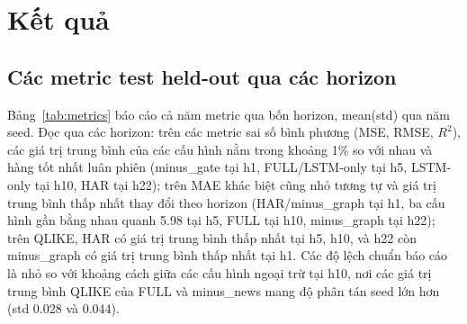\documentclass[runningheads]{llncs}
\begin{document}
\section{Kết quả}
\label{sec:results}

\subsection{Các metric test held-out qua các horizon}
\label{sec:metrics}
Bảng~\ref{tab:metrics} báo cáo cả năm metric qua bốn horizon, mean(std) qua năm seed. Đọc qua các
horizon: trên các metric sai số bình phương (MSE, RMSE, $R^2$), các giá trị trung bình của các cấu hình
nằm trong khoảng 1\% so với nhau và hàng tốt nhất luân phiên (minus\_gate tại h1, FULL/LSTM-only tại h5,
LSTM-only tại h10, HAR tại h22); trên MAE khác biệt cũng nhỏ tương tự và giá trị trung bình thấp nhất
thay đổi theo horizon (HAR/minus\_graph tại h1, ba cấu hình gần bằng nhau quanh 5.98 tại h5, FULL tại h10,
minus\_graph tại h22); trên QLIKE, HAR có giá trị trung bình thấp nhất tại h5, h10, và h22 còn minus\_graph
có giá trị trung bình thấp nhất tại h1. Các độ lệch chuẩn báo cáo là nhỏ so với khoảng cách giữa các cấu
hình ngoại trừ tại h10, nơi các giá trị trung bình QLIKE của FULL và minus\_news mang độ phân tán seed
lớn hơn (std 0.028 và 0.044).
\end{document}
